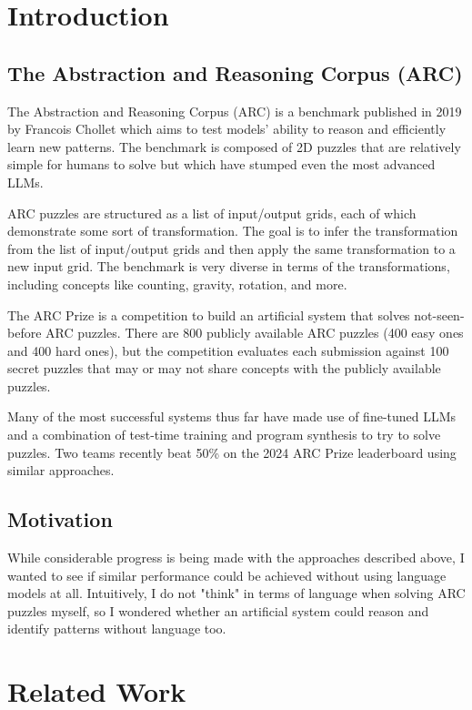 \documentclass[10pt,twocolumn]{article}
\begin{document}
\section{Introduction}

\subsection{The Abstraction and Reasoning Corpus (ARC)}
The Abstraction and Reasoning Corpus (ARC)\cite{arc} is a benchmark published
in 2019 by Francois Chollet which aims to test models' ability to
reason and efficiently learn new patterns. The benchmark is composed
of 2D puzzles that are relatively simple for humans to solve but
which have stumped even the most advanced LLMs.

ARC puzzles are structured as a list of
input/output grids, each of which demonstrate some sort of
transformation. The goal is to infer the transformation from the list
of input/output grids and then apply the same transformation to a new
input grid. The benchmark is very diverse in terms of the
transformations, including concepts like counting, gravity, rotation, and more.

The ARC Prize\cite{arcprize2024} is a competition to build an
artificial system that solves not-seen-before ARC puzzles. There are
800 publicly available ARC puzzles (400 easy ones and 400 hard ones),
but the competition evaluates each submission against 100 secret
puzzles that may or may not share concepts with the publicly available puzzles.

Many of the most successful systems thus far have made use of
fine-tuned LLMs and a combination of test-time training and program
synthesis to try to solve puzzles. Two teams recently beat 50\% on
the 2024 ARC Prize leaderboard using similar approaches.

\subsection{Motivation}
While considerable progress is being made with the approaches
described above, I wanted to see if similar performance could be achieved
without using language models at all. Intuitively, I do not "think"
in terms of language when solving ARC puzzles myself, so I wondered
whether an artificial system could reason and identify patterns
without language too.

\section{Related Work}
\end{document}

